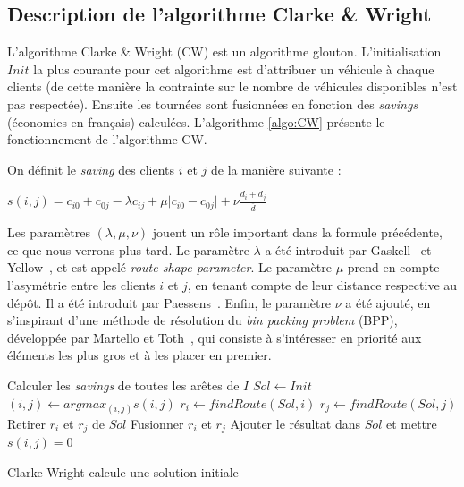 \documentclass[a4paper,11pt]{article}%
\begin{document}
\subsection{Description de l'algorithme Clarke \& Wright}
L'algorithme Clarke \& Wright (CW) est un algorithme glouton. 
L'initialisation $Init$ la plus courante pour cet algorithme est d'attribuer un véhicule à chaque clients (de cette manière la contrainte sur le nombre de véhicules disponibles n'est pas respectée). 
Ensuite les tournées sont fusionnées en fonction des \emph{savings} (économies en français) calculées. L'algorithme \ref{algo:CW} présente le fonctionnement de l'algorithme CW.

On définit le \emph{saving} des clients $i$ et $j$ de la manière suivante :

\begin{center}
$s(i,j) = c_{i0} + c_{0j} - \lambda c_{ij} + \mu \vert c_{i0} - c_{0j} \vert + \nu \frac{d_i + d_j}{\overline{d}}$
\end{center}

Les paramètres $(\lambda, \mu, \nu)$ jouent un rôle important dans la formule précédente, ce que nous verrons plus tard. Le paramètre $\lambda$ a été introduit par Gaskell~\cite{Gaskell} et Yellow~\cite{Yellow}, et est appelé \emph{route shape parameter}. Le paramètre $\mu$ prend en compte l'asymétrie entre les clients $i$ et $j$, en tenant compte de leur distance respective au dépôt. Il a été introduit par Paessens~\cite{Paessens}. Enfin, le paramètre $\nu$ a été ajouté, en s'inspirant d'une méthode de résolution du \emph{bin packing problem} (BPP), développée par Martello et Toth~\cite{Martello}, qui consiste à s'intéresser en priorité aux éléments les plus gros et à les placer en premier. 


\begin{algorithm}
\DontPrintSemicolon %

Calculer les \emph{savings} de toutes les arêtes de $I$\;
$Sol \gets Init$\;
 {
	$(i,j) \gets argmax_{(i,j)} s(i,j)$\;
	$r_i \gets findRoute(Sol,i)$\;
	$r_j \gets findRoute(Sol,j)$\;
	 {
		Retirer $r_i$ et $r_j$ de $Sol$\;
		Fusionner $r_i$ et $r_j$\;
		Ajouter le résultat dans $Sol$ et mettre $s(i,j) = 0$\;
	}
}

\;
\caption{{\sc Clarke-Wright} calcule une solution initiale}
\label{algo:CW}
\end{algorithm}
\end{document}
